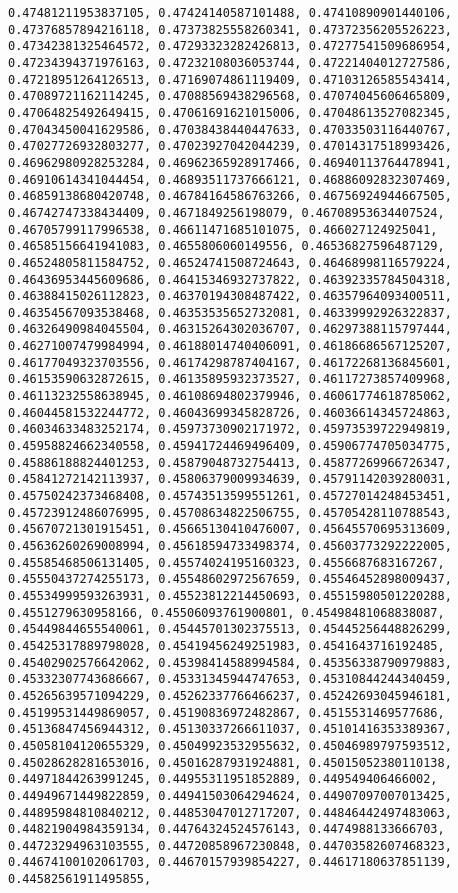 \documentclass[11pt]{article}
\begin{document}
\begin{Verbatim}[commandchars=\\\{\}]
0.47481211953837105, 0.47424140587101488, 0.47410890901440106, 0.47376857894216118, 0.47373825558260341, 0.47372356205526223, 0.47342381325464572, 0.47293323282426813, 0.47277541509686954, 0.47234394371976163, 0.47232108036053744, 0.47221404012727586, 0.47218951264126513, 0.47169074861119409, 0.47103126585543414, 0.47089721162114245, 0.47088569438296568, 0.47074045606465809, 0.47064825492649415, 0.47061691621015006, 0.47048613527082345, 0.47043450041629586, 0.47038438440447633, 0.47033503116440767, 0.47027726932803277, 0.47023927042044239, 0.47014317518993426, 0.46962980928253284, 0.46962365928917466, 0.46940113764478941, 0.46910614341044454, 0.46893511737666121, 0.46886092832307469, 0.46859138680420748, 0.46784164586763266, 0.46756924944667505, 0.46742747338434409, 0.4671849256198079, 0.46708953634407524, 0.46705799117996538, 0.46611471685101075, 0.466027124925041, 0.46585156641941083, 0.4655806060149556, 0.46536827596487129, 0.46524805811584752, 0.46524741508724643, 0.46468998116579224, 0.46436953445609686, 0.46415346932737822, 0.46392335784504318, 0.46388415026112823, 0.46370194308487422, 0.46357964093400511, 0.46354567093538468, 0.46353535652732081, 0.46339992926322837, 0.46326490984045504, 0.46315264302036707, 0.46297388115797444, 0.46271007479984994, 0.46188014740406091, 0.46186686567125207, 0.46177049323703556, 0.46174298787404167, 0.46172268136845601, 0.46153590632872615, 0.46135895932373527, 0.46117273857409968, 0.46113232558638945, 0.46108694802379946, 0.46061774618785062, 0.46044581532244772, 0.46043699345828726, 0.46036614345724863, 0.46034633483252174, 0.45973730902171972, 0.45973539722949819, 0.45958824662340558, 0.45941724469496409, 0.45906774705034775, 0.45886188824401253, 0.45879048732754413, 0.45877269966726347, 0.45841272142113937, 0.45806379009934639, 0.45791142039280031, 0.45750242373468408, 0.45743513599551261, 0.45727014248453451, 0.45723912486076995, 0.45708634822506755, 0.45705428110788543, 0.45670721301915451, 0.45665130410476007, 0.45645570695313609, 0.45636260269008994, 0.45618594733498374, 0.45603773292222005, 0.45585468506131405, 0.45574024195160323, 0.4556687683167267, 0.45550437274255173, 0.45548602972567659, 0.45546452898009437, 0.45534999593263931, 0.45523812214450693, 0.45515980501220288, 0.4551279630958166, 0.45506093761900801, 0.45498481068838087, 0.45449844655540061, 0.45445701302375513, 0.45445256448826299, 0.45425317889798028, 0.45419456249251983, 0.4541643716192485, 0.45402902576642062, 0.45398414588994584, 0.45356338790979883, 0.45332307743686667, 0.45331345944747653, 0.45310844244340459, 0.45265639571094229, 0.45262337766466237, 0.45242693045946181, 0.45199531449869057, 0.45190836972482867, 0.4515531469577686, 0.45136847456944312, 0.45130337266611037, 0.45101416353389367, 0.45058104120655329, 0.45049923532955632, 0.45046989797593512, 0.45028628281653016, 0.45016287931924881, 0.45015052380110138, 0.44971844263991245, 0.44955311951852889, 0.449549406466002, 0.44949671449822859, 0.44941503064294624, 0.44907097007013425, 0.44895984810840212, 0.44853047012717207, 0.44846442497483063, 0.44821904984359134, 0.44764324524576143, 0.4474988133666703, 0.44723294963103555, 0.44720858967230848, 0.44703582607468323, 0.44674100102061703, 0.44670157939854227, 0.44617180637851139, 0.44582561911495855, 
\end{Verbatim}
\end{document}
